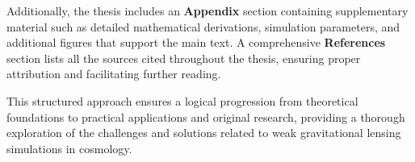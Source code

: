 Additionally, the thesis includes an \textbf{Appendix} section containing supplementary material such as detailed mathematical derivations, simulation parameters, and additional figures that support the main text. A comprehensive \textbf{References} section lists all the sources cited throughout the thesis, ensuring proper attribution and facilitating further reading.

This structured approach ensures a logical progression from theoretical foundations to practical applications and original research, providing a thorough exploration of the challenges and solutions related to weak gravitational lensing simulations in cosmology.


